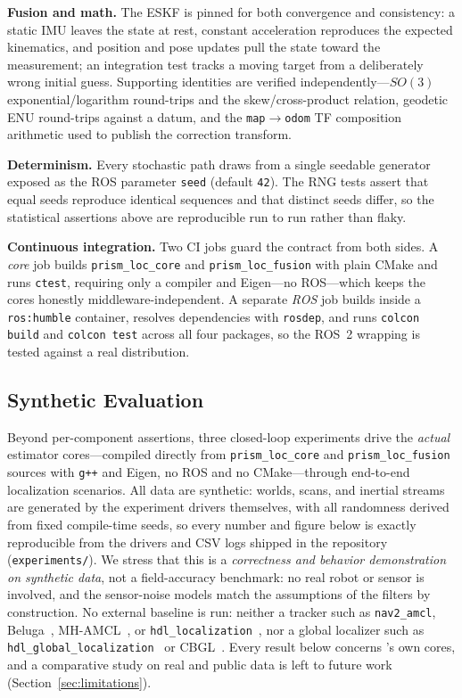 \textbf{Fusion and math.}
The ESKF is pinned for both convergence and consistency: a static IMU
leaves the state at rest, constant acceleration reproduces the expected
kinematics, and position and pose updates pull the state toward the
measurement; an integration test tracks a moving target from a
deliberately wrong initial guess. Supporting identities are verified
independently---$SO(3)$ exponential/logarithm round-trips and the
skew/cross-product relation, geodetic ENU round-trips against a datum,
and the \texttt{map}$\to$\texttt{odom} TF composition arithmetic used to
publish the correction transform.

\textbf{Determinism.}
Every stochastic path draws from a single seedable generator exposed as
the ROS parameter \texttt{seed} (default \texttt{42}). The RNG tests
assert that equal seeds reproduce identical sequences and that distinct
seeds differ, so the statistical assertions above are reproducible run
to run rather than flaky.

\textbf{Continuous integration.}
Two CI jobs guard the contract from both sides. A \emph{core} job builds
\texttt{prism\_loc\_core} and \texttt{prism\_loc\_fusion} with plain
CMake and runs \texttt{ctest}, requiring only a compiler and Eigen---no
ROS---which keeps the cores honestly middleware-independent. A separate
\emph{ROS} job builds inside a \texttt{ros:humble} container, resolves
dependencies with \texttt{rosdep}, and runs \texttt{colcon build} and
\texttt{colcon test} across all four packages, so the ROS~2 wrapping is
tested against a real distribution.

\subsection{Synthetic Evaluation}\label{sec:synth}

Beyond per-component assertions, three closed-loop experiments drive
the \emph{actual} estimator cores---compiled directly from
\texttt{prism\_loc\_core} and \texttt{prism\_loc\_fusion} sources with
\texttt{g++} and Eigen, no ROS and no CMake---through end-to-end
localization scenarios. All data are synthetic: worlds, scans, and
inertial streams are generated by the experiment drivers themselves,
with all randomness derived from fixed compile-time seeds, so every
number and figure below is exactly reproducible from the drivers and
CSV logs shipped in the repository (\texttt{experiments/}). We stress
that this is a \emph{correctness and behavior demonstration on
synthetic data}, not a field-accuracy benchmark: no real robot or
sensor is involved, and the sensor-noise models match the assumptions
of the filters by construction. No external baseline is run: neither a
tracker such as \texttt{nav2\_amcl}, Beluga~\cite{puga2024beluga},
MH-AMCL~\cite{garcia2023mhamcl}, or
\texttt{hdl\_localization}~\cite{koide2019portable}, nor a global
localizer such as \texttt{hdl\_global\_localization}~\cite{koide2021hdlgl}
or CBGL~\cite{filotheou2024cbgl}. Every result below concerns
\prismloc{}'s own cores, and a comparative study on real and public data
is left to future work (Section~\ref{sec:limitations}).

